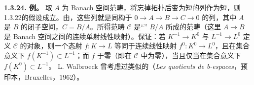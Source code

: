 \par\medskip\noindent\textbf{1.3.24. 例。} 取 $A$ 为 Banach 空间范畴，将忘掉拓扑后变为短的列作为短，则1.3.22的假设成立。由，这些列就是同构于 $0\to A\to B\to C\to0$ 的列，其中 $A$ 是 $B$ 的闭子空间，$C=B/A$。所得范畴 $\mathcal C$ 是“” $B/A$ 所成的范畴（这里 $A\to B$ 是 Banach 空间之间的连续单射线性映射）。保证：若 $K^{-1}\to K^0$ 与 $L^{-1}\to L^0$ 定义 $\mathcal C$ 的对象，则一个态射 $f:K\to L$ 等同于连续线性映射 $f^0:K^0\to L^0$，且在集合意义下 $f(K^{-1})\subset L^{-1}$；而 $f$ 于零（即在 $\mathcal C$ 中为零），当且仅当在集合意义下 $f(K^0)\subset L^{-1}$。
L. Walbroeck 曾考虑过类似的（\emph{Les quotients de b-espaces}，预印本，Bruxelles，1962）。
